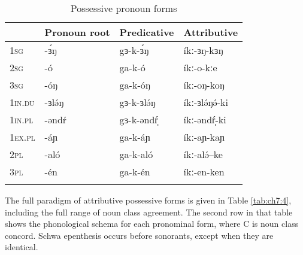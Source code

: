 \begin{table}
	\begin{tabular}[t]{llll}
	\lsptoprule
						& Pronoun root			&	Predicative &	Attributive\\
	\midrule
1\textsc{sg}			& -ɜ́ŋ		& 	gɜ-k-ɜ́ŋ 	 & íkː-ɜŋ-kɜŋ \\
2\textsc{sg}			& -ó		&	ga-k-ó	 & íkː-o-kːe \\
3\textsc{sg}			& -óŋ		&	ga-k-óŋ	 & íkː-oŋ-koŋ\\
1\textsc{in}.\textsc{du} & -ɜlə́ŋ  	&   gɜ-k-ɜlə́ŋ	 & íkː-ɜlə́ŋə́-ki\\
1\textsc{in}.\textsc{pl} &  -əndŕ  	&   gɜ-k-əndŕ̩	 & íkː-əndŕ̩-ki \\
1\textsc{ex}.\textsc{pl} &   -áɲ 	&   ga-k-áɲ 	 & íkː-aɲ-kaɲ \\
2\textsc{pl}			& -aló    	&	ga-k-aló	 & íkː-alə́--ke	\\
3\textsc{pl}			& -én 		&	ga-k-én 	 & íkː-en-ken \\
	\lspbottomrule
	\end{tabular}
	\caption{Possessive pronoun forms}
	\label{tab:ch7:3}
\end{table} 

The full paradigm of attributive possessive forms is given in Table \ref{tab:ch7:4}, including the full range of noun class agreement. The second row in that table shows the phonological schema for each pronominal form, where C is noun class concord. Schwa epenthesis occurs before sonorants, except when they are identical.


